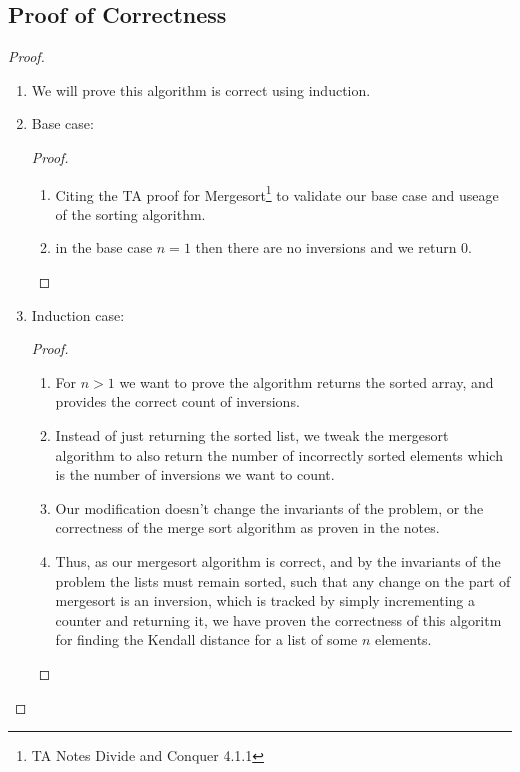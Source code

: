 \documentclass{article}
\begin{document}
\subsection{Proof of Correctness}
\begin{proof}
      \begin{enumerate}
            \item We will prove this algorithm is correct using induction.
            \item Base case:
                  \begin{proof}
                        \begin{enumerate}
                              \item Citing the TA proof for Mergesort\footnote{TA Notes Divide and Conquer 4.1.1
                                    } to validate our base case and useage of the sorting
                                    algorithm.
                              \item in the base case \(n=1\) then there are no inversions and we
                                    return 0.
                        \end{enumerate}
                  \end{proof}
            \item Induction case:
                  \begin{proof}
                        \begin{enumerate}
                              \item For \(n>1\) we want to prove the algorithm returns the sorted
                                    array, and provides the correct count of inversions.
                              \item Instead of just returning the sorted list, we tweak the
                                    mergesort algorithm to also return the number of incorrectly sorted
                                    elements which is the number of inversions we want to count.
                              \item Our modification doesn't change the invariants of the problem,
                                    or the correctness of the merge sort algorithm as proven in
                                    the notes.
                              \item Thus, as our mergesort algorithm is correct, and by the
                                    invariants of the problem the lists must remain sorted, such that
                                    any change on the part of mergesort is an inversion, which is
                                    tracked by simply incrementing a counter and returning it, we
                                    have proven the correctness of this algoritm for finding the
                                    Kendall distance for a list of some \(n\) elements.
                        \end{enumerate}
                  \end{proof}
      \end{enumerate}
\end{proof}
\end{document}
